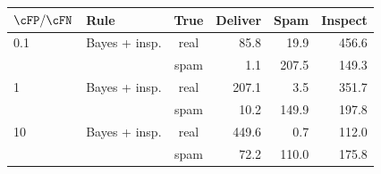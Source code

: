 \begin{tabular}{llcrrr}
\toprule
$\cFP/\cFN$ & Rule & True & Deliver & Spam & Inspect \\
\midrule
0.1 & Bayes + insp. & real & 85.8 & 19.9 & 456.6 \\
 &  & spam & 1.1 & 207.5 & 149.3 \\
\midrule
1 & Bayes + insp. & real & 207.1 & 3.5 & 351.7 \\
 &  & spam & 10.2 & 149.9 & 197.8 \\
\midrule
10 & Bayes + insp. & real & 449.6 & 0.7 & 112.0 \\
 &  & spam & 72.2 & 110.0 & 175.8 \\
\bottomrule
\end{tabular}
